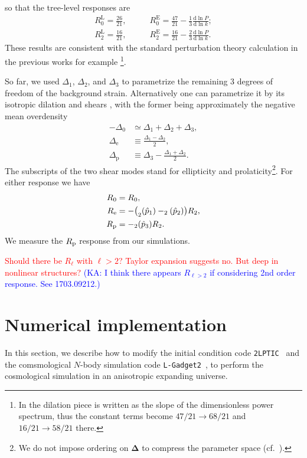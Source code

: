 \documentclass[a4paper,11pt]{article}
\let\L\relax
\DeclareMathOperator{\L}{\mathcal{L}}
\renewcommand{\d}{\mathrm{d}}
\newcommand{\vDelta}{{\bm\Delta}}
\newcommand{\Euler}{\mathrm{E}}
\newcommand{\Lagrange}{\mathrm{L}}
\newcommand{\HL}[1]{\textcolor{red}{#1}} %
\newcommand{\KA}[1]{\textcolor{Blue}{(KA: #1)}}
\begin{document}
so that the tree-level responses are
\begin{align}
    R^\Lagrange_0 = \frac{26}{21}, \qquad
    & R^\Euler_0 = \frac{47}{21} - \frac13 \frac{\d\ln P}{\d\ln k};
    \nonumber\\
    R^\Lagrange_2 = \frac{16}{21}, \qquad
    & R^\Euler_2 = \frac{16}{21} - \frac23 \frac{\d\ln P}{\d\ln k}.
\end{align}
These results are consistent with the standard perturbation theory calculation
in the previous works for example \cite{LiSchmittfullSeljak17}\footnote{In
\cite{LiSchmittfullSeljak17} the dilation piece is written as the slope of the
dimensionless power spectrum, thus the constant terms become $47/21 \to 68/21$
and $16/21 \to 58/21$ there.}.

So far, we used $\Delta_1$, $\Delta_2$, and $\Delta_3$ to parametrize the remaining 3 degrees of freedom of the
background strain.
Alternatively one can parametrize it
 by its isotropic dilation and shears \cite{BondMyers96I},
with the former being approximately the negative mean overdensity
\begin{align}
    -\Delta_0 &\simeq \Delta_1 + \Delta_2 + \Delta_3, \nonumber\\
    \Delta_\mathrm{e} &\equiv \frac{\Delta_1 - \Delta_2}2, \nonumber\\
    \Delta_\mathrm{p} &\equiv \Delta_3 - \frac{\Delta_1 + \Delta_2}2.
\end{align}
The subscripts of the two shear modes stand for ellipticity and
prolaticity\footnote{We do not impose ordering on $\vDelta$ to compress the
parameter space (cf.\ \cite{BondMyers96I}).}.
For either response we have
\begin{align}
    R_0 &= R_0, \nonumber\\
    R_\mathrm{e}
    &= - \bigl(\L_2(\hat p_1) - \L_2(\hat p_2)\bigr) R_2, \nonumber\\
    R_\mathrm{p} &= - \L_2(\hat p_3) R_2.
\end{align}
We measure the $R_{\rm p}$ response from our simulations.

\HL{Should there be $R_\ell$ with $\ell>2$? Taylor expansion suggests
no. But deep in nonlinear structures?}
\KA{I think there appears $R_{\ell >2}$ if considering 2nd order response. See 1703.09212.}



\section{Numerical implementation}
\label{sec:num}
In this section, we describe how to modify the initial condition code
\texttt{2LPTIC}~\cite{Crocce_etal:2006} and
the comsmological $N$-body simulation code \texttt{L-Gadget2}~\cite{Springel05},
to perform the cosmological simulation in an anisotropic expanding universe.
\end{document}
